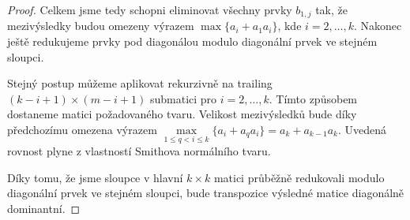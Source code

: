 \begin{proof}
Celkem jsme tedy schopni eliminovat všechny prvky $ b_{1,j} $ tak, že  
mezivýsledky budou omezeny výrazem $ \max\{ a_i + a_1 a_i \} $, kde 
$ i = 2,\dots,k $. Nakonec ještě redukujeme prvky pod diagonálou modulo 
diagonální prvek ve stejném sloupci.

Stejný postup můžeme aplikovat rekurzivně na trailing
$ (k - i + 1) \times (m - i + 1) $ submatici pro $ i = 2,\dots, k $. Tímto 
způsobem dostaneme matici požadovaného tvaru. Velikost mezivýsledků bude 
díky předchozímu omezena výrazem 
$ \max\limits_{1 \leq q < i \leq k}\{ a_i + a_q a_i \} = a_k + a_{k - 1} a_k $.
Uvedená rovnost plyne z vlastností Smithova normálního tvaru. 

Díky tomu, že jsme sloupce v hlavní $ k \times k $ matici průběžně redukovali
modulo diagonální prvek ve stejném sloupci, bude transpozice výsledné matice 
diagonálně dominantní.
\end{proof}

